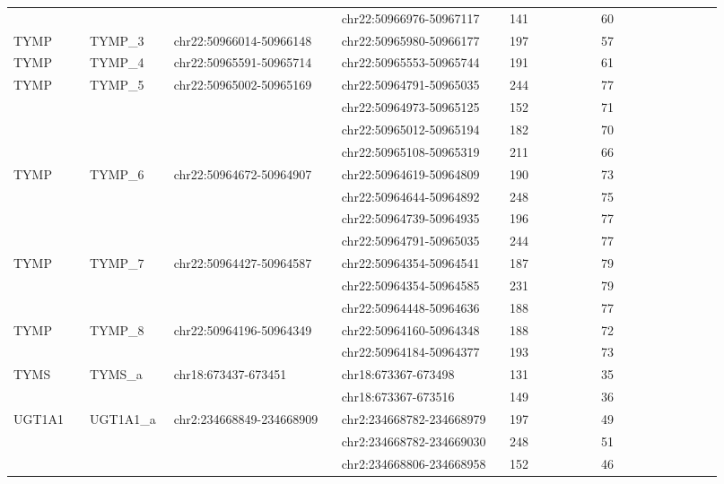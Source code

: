 \begin{landscape}
\begin{longtable}{p{0.1\linewidth}|p{0.1\linewidth}p{0.22\linewidth}p{0.22\linewidth}p{0.12\linewidth}p{0.16\linewidth}}
\\
 & & & chr22:50966976-50967117 & 141 & 60
\\
TYMP & TYMP\_3 & chr22:50966014-50966148 & chr22:50965980-50966177 & 197 & 57
\\
TYMP & TYMP\_4 & chr22:50965591-50965714 & chr22:50965553-50965744 & 191 & 61
\\
TYMP & TYMP\_5 & chr22:50965002-50965169 & chr22:50964791-50965035 & 244 & 77
\\
 & & & chr22:50964973-50965125 & 152 & 71
\\
 & & & chr22:50965012-50965194 & 182 & 70
\\
 & & & chr22:50965108-50965319 & 211 & 66
\\
TYMP & TYMP\_6 & chr22:50964672-50964907 & chr22:50964619-50964809 & 190 & 73
\\
 & & & chr22:50964644-50964892 & 248 & 75
\\
 & & & chr22:50964739-50964935 & 196 & 77
\\
 & & & chr22:50964791-50965035 & 244 & 77
\\
TYMP & TYMP\_7 & chr22:50964427-50964587 & chr22:50964354-50964541 & 187 & 79
\\
 & & & chr22:50964354-50964585 & 231 & 79
\\
 & & & chr22:50964448-50964636 & 188 & 77
\\
TYMP & TYMP\_8 & chr22:50964196-50964349 & chr22:50964160-50964348 & 188 & 72
\\
 & & & chr22:50964184-50964377 & 193 & 73
\\
\hline
TYMS & TYMS\_a & chr18:673437-673451 & chr18:673367-673498 & 131 & 35
\\
 & & & chr18:673367-673516 & 149 & 36
\\
\hline
UGT1A1 & UGT1A1\_a & chr2:234668849-234668909 & chr2:234668782-234668979 & 197 & 49
\\
 & & & chr2:234668782-234669030 & 248 & 51
\\
 & & & chr2:234668806-234668958 & 152 & 46
\\
\hline

\end{longtable}
\end{landscape}
